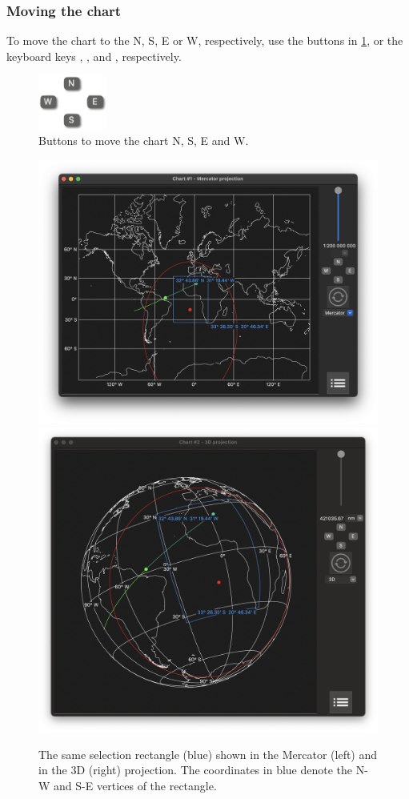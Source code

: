 \documentclass{ol-softwaremanual}
\begin{document}
\subsubsection{Moving the chart}




To move the chart to the \ac{N}, \ac{S}, \ac{E} or \ac{W}, respectively, use the buttons in \cref{fig-directional-buttons}, or the keyboard keys \keys{\arrowkeyup}, \keys{\arrowkeydown}, \keys{\arrowkeyright} and \keys{\arrowkeyleft}, respectively.  

\begin{figure}
  \includegraphics[width=0.2\textwidth]{figures/directional-buttons.png}
  \caption{\label{fig-directional-buttons} Buttons to move the chart \ac{N}, \ac{S}, \ac{E} and \ac{W}. }
  \end{figure}

\begin{figure}
  \includegraphics[height=0.4\textwidth]{figures/selection-rectangle-mercator.png}
  \includegraphics[height=0.4\textwidth]{figures/selection-rectangle-3d.png}
  \caption{
    \label{fig-selection-rectangle}
   The same selection rectangle (blue) shown in the Mercator (left) and in the 3D (right) projection. The coordinates in blue denote the \acl{N}-\ac{W} and \acl{S}-\acl{E} vertices of the rectangle. 
  }
\end{figure}
\end{document}
